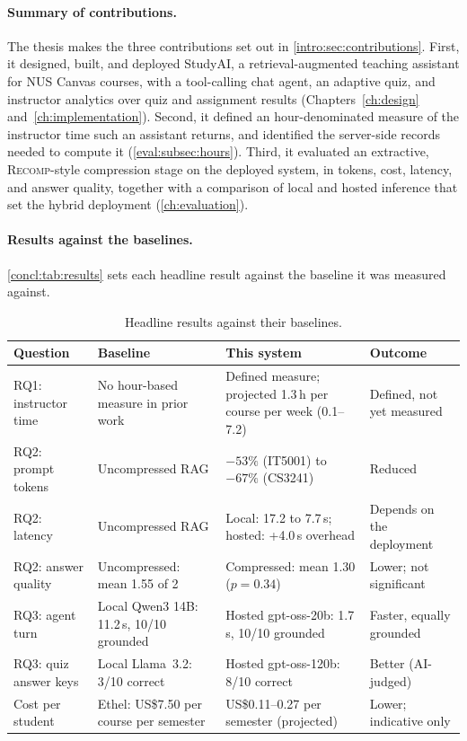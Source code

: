 \paragraph{Summary of contributions.} The thesis makes the three
contributions set out in \autoref{intro:sec:contributions}. First, it
designed, built, and deployed StudyAI, a retrieval-augmented teaching
assistant for NUS Canvas courses, with a tool-calling chat agent,
an adaptive quiz, and instructor analytics over quiz and assignment results
(Chapters~\ref{ch:design} and~\ref{ch:implementation}). Second, it defined
an hour-denominated measure of the instructor time such an assistant
returns, and identified the server-side records needed to compute it
(\autoref{eval:subsec:hours}). Third, it evaluated an extractive,
\textsc{Recomp}-style compression stage on the deployed system, in tokens,
cost, latency, and answer quality, together with a comparison of local and
hosted inference that set the hybrid deployment
(\autoref{ch:evaluation}).

\paragraph{Results against the baselines.} \autoref{concl:tab:results}
sets each headline result against the baseline it was measured against.

\begin{table}[htb]
  \centering
  \caption{Headline results against their baselines.}
  \label{concl:tab:results}
  \footnotesize
  \renewcommand{\arraystretch}{1.2}
  \begin{tabular}{L{0.17\textwidth} L{0.25\textwidth} L{0.25\textwidth} L{0.21\textwidth}}
    \hline
    \textbf{Question} & \textbf{Baseline} & \textbf{This system} & \textbf{Outcome} \\
    \hline
    RQ1: instructor time &
      No hour-based measure in prior work &
      Defined measure; projected 1.3\,h per course per week (0.1--7.2) &
      Defined, not yet measured \\
    RQ2: prompt tokens &
      Uncompressed RAG &
      $-53\%$ (IT5001) to $-67\%$ (CS3241) &
      Reduced \\
    RQ2: latency &
      Uncompressed RAG &
      Local: 17.2 to 7.7\,s; hosted: +4.0\,s overhead &
      Depends on the deployment \\
    RQ2: answer quality &
      Uncompressed: mean 1.55 of 2 &
      Compressed: mean 1.30 ($p=0.34$) &
      Lower; not significant \\
    RQ3: agent turn &
      Local Qwen3 14B: 11.2\,s, 10/10 grounded &
      Hosted gpt-oss-20b: 1.7\,s, 10/10 grounded &
      Faster, equally grounded \\
    RQ3: quiz answer keys &
      Local Llama~3.2: 3/10 correct &
      Hosted gpt-oss-120b: 8/10 correct &
      Better (AI-judged) \\
    Cost per student &
      Ethel: US\$7.50 per course per semester &
      US\$0.11--0.27 per semester (projected) &
      Lower; indicative only \\
    \hline
  \end{tabular}
\end{table}

